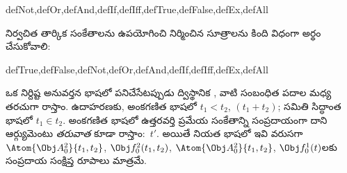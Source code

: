 \documentclass[../../../include/open-logic-section]{subfiles}
\begin{document}
\begin{tagblock}{defNot,defOr,defAnd,defIf,defIff,defTrue,defFalse,defEx,defAll}
\begin{defn}
నిర్వచిత తార్కిక సంకేతాలను ఉపయోగించి నిర్మించిన సూత్రాలను కింది విధంగా
అర్థం చేసుకోవాలి:

\begin{tagenumerate}{defTrue,defFalse,defNot,defOr,defAnd,defIf,defIff,defEx,defAll}









\end{tagenumerate}
\end{defn}
\end{tagblock}

ఒక నిర్దిష్ట అనువర్తన భాషలో పనిచేసేటప్పుడు ద్విస్థానిక
,  వాటి సంబంధిత పదాల మధ్య తరచుగా రాస్తాం.
ఉదాహరణకు, అంకగణిత భాషలో $t_1 < t_2$, $(t_1 + t_2)$; సమితి సిద్ధాంత
భాషలో $t_1 \in t_2$. అంకగణిత భాషలో ఉత్తరవర్తి ప్రమేయ సంకేతాన్ని
సంప్రదాయంగా దాని ఆర్గ్యుమెంటు \emph{తరువాత} కూడా రాస్తాం:~$t'$.
అయితే నియత భాషలో ఇవి వరుసగా $\Atom{\Obj A^2_0}{t_1, t_2}$,
$\Obj f^2_0(t_1, t_2)$, $\Atom{\Obj A^2_0}{t_1, t_2}$,
$\Obj f^1_0(t)$లకు సంప్రదాయ సంక్షిప్త రూపాలు మాత్రమే.
\end{document}
